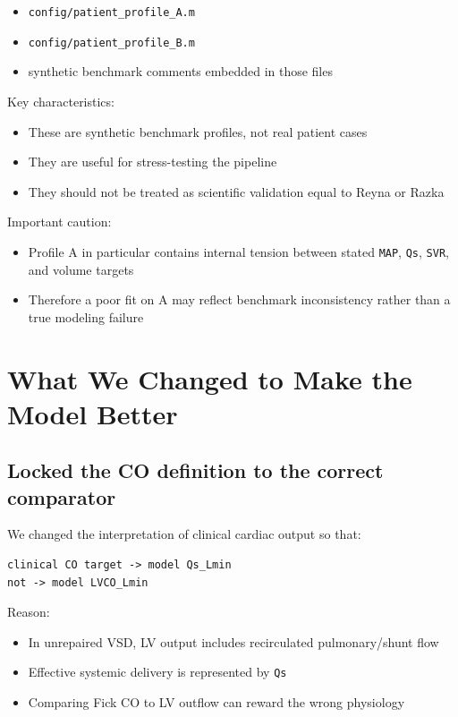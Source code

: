 \documentclass[11pt,a4paper]{article}
\begin{document}
\begin{itemize}[leftmargin=1.5em]
    \item \texttt{config/patient\_profile\_A.m}
    \item \texttt{config/patient\_profile\_B.m}
    \item synthetic benchmark comments embedded in those files
\end{itemize}

Key characteristics:

\begin{itemize}[leftmargin=1.5em]
    \item These are synthetic benchmark profiles, not real patient cases
    \item They are useful for stress-testing the pipeline
    \item They should not be treated as scientific validation equal to Reyna or Razka
\end{itemize}

Important caution:

\begin{itemize}[leftmargin=1.5em]
    \item Profile A in particular contains internal tension between stated
    \texttt{MAP}, \texttt{Qs}, \texttt{SVR}, and volume targets
    \item Therefore a poor fit on A may reflect benchmark inconsistency rather
    than a true modeling failure
\end{itemize}

\section{What We Changed to Make the Model Better}

\subsection{Locked the CO definition to the correct comparator}

We changed the interpretation of clinical cardiac output so that:

\begin{verbatim}
clinical CO target -> model Qs_Lmin
not -> model LVCO_Lmin
\end{verbatim}

Reason:

\begin{itemize}[leftmargin=1.5em]
    \item In unrepaired VSD, LV output includes recirculated pulmonary/shunt flow
    \item Effective systemic delivery is represented by \texttt{Qs}
    \item Comparing Fick CO to LV outflow can reward the wrong physiology
\end{itemize}
\end{document}
